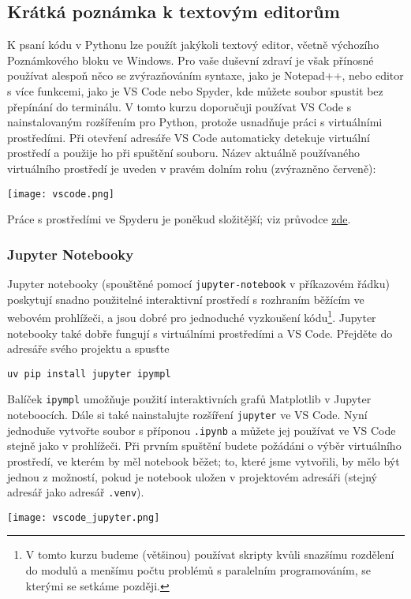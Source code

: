 \subsection{Krátká poznámka k textovým editorům}
K psaní kódu v Pythonu lze použít jakýkoli textový editor, včetně výchozího Poznámkového bloku ve Windows. Pro vaše duševní zdraví je však přínosné používat alespoň něco se zvýrazňováním syntaxe, jako je Notepad++, nebo editor s více funkcemi, jako je VS Code nebo Spyder, kde můžete soubor spustit bez přepínání do terminálu. V tomto kurzu doporučuji používat VS Code s nainstalovaným rozšířením pro Python, protože usnadňuje práci s virtuálními prostředími. Při otevření adresáře VS Code automaticky detekuje virtuální prostředí a použije ho při spuštění souboru. Název aktuálně používaného virtuálního prostředí je uveden v pravém dolním rohu (zvýrazněno červeně):
\begin{center}
    \texttt{[image: vscode.png]}
\end{center}

Práce s prostředími ve Spyderu je poněkud složitější; viz průvodce \href{https://github.com/spyder-ide/spyder/wiki/Working-with-packages-and-environments-in-Spyder#working-with-other-environments-and-python-installations}{zde}.

\subsubsection{Jupyter Notebooky}
Jupyter notebooky (spouštěné pomocí \verb|jupyter-notebook| v příkazovém řádku) poskytují snadno použitelné interaktivní prostředí s rozhraním běžícím ve webovém prohlížeči, a jsou dobré pro jednoduché vyzkoušení kódu\footnote{V tomto kurzu budeme (většinou) používat skripty kvůli snazšímu rozdělení do modulů a menšímu počtu problémů s paralelním programováním, se kterými se setkáme později.}. Jupyter notebooky také dobře fungují s virtuálními prostředími a VS Code. Přejděte do adresáře svého projektu a spusťte
\begin{lstlisting}
uv pip install jupyter ipympl
\end{lstlisting}
Balíček \verb|ipympl| umožňuje použití interaktivních grafů Matplotlib v Jupyter noteboocích. Dále si také nainstalujte rozšíření \verb|jupyter| ve VS Code. Nyní jednoduše vytvořte soubor s příponou \verb|.ipynb| a můžete jej používat ve VS Code stejně jako v prohlížeči. Při prvním spuštění budete požádáni o výběr virtuálního prostředí, ve kterém by měl notebook běžet; to, které jsme vytvořili, by mělo být jednou z možností, pokud je notebook uložen v projektovém adresáři (stejný adresář jako adresář \verb|.venv|).

\begin{center}
    \texttt{[image: vscode\_jupyter.png]}
\end{center}